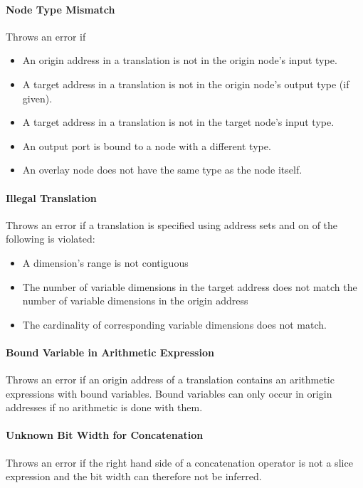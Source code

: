 \documentclass[a4paper,11pt,twoside]{report}
\begin{document}
{{{\paragraph{Node Type Mismatch}
Throws an error if
\begin{itemize}
  \item An origin address in a translation is not in the origin node's input type.
  \item A target address in a translation is not in the origin node's output type (if given).
  \item A target address in a translation is not in the target node's input type.
  \item An output port is bound to a node with a different type.
  \item An overlay node does not have the same type as the node itself.
\end{itemize}

\paragraph{Illegal Translation}
Throws an error if a translation is specified using address sets and on of the following is violated:
\begin{itemize}
  \item A dimension's range is not contiguous
  \item The number of variable dimensions in the target address does not match the number of variable dimensions in the origin address
  \item The cardinality of corresponding variable dimensions does not match.
\end{itemize}

\paragraph{Bound Variable in Arithmetic Expression}
Throws an error if an origin address of a translation contains an arithmetic expressions with bound variables.
Bound variables can only occur in origin addresses if no arithmetic is done with them.

\paragraph{Unknown Bit Width for Concatenation}
Throws an error if the right hand side of a concatenation operator is not a slice expression and the bit width can therefore not be inferred.

}}}
\end{document}
